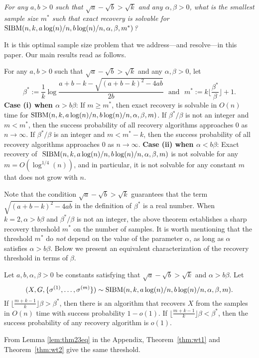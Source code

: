 \documentclass{article}
\begin{document}
\vspace*{.1in}
 \emph{For any $a,b> 0$ such that $\sqrt{a}-\sqrt{b}> \sqrt{k}$ and any $\alpha,\beta>0$, what is the smallest sample size $m^\ast$ such that exact recovery is solvable for $\operatorname{SIBM}(n,k, a\log(n)/n, b\log(n)/n,\alpha,\beta,m^\ast)$?}

\vspace*{.1in}  It is this optimal sample size problem that we address---and resolve---in this paper. 
Our main results read as follows.

\begin{theorem} \label{thm:wt1}
For any $a,b> 0$ such that $\sqrt{a}-\sqrt{b}> \sqrt{k}$ and any $\alpha,\beta>0$, let
\begin{equation} \label{eq:defstar}
\beta^\ast := \frac{1}{k}
\log\frac{a+b-k-\sqrt{(a+b-k)^2-4ab}}{2 b} \text{~~and~~}
m^\ast := k \Big\lfloor \frac{\beta^\ast}{\beta} \Big\rfloor +1  .
\end{equation}
{\bf Case (i) when $\alpha>b\beta$}: If $m\ge m^\ast$, then exact recovery is solvable in $O(n)$ time for $\SIBM(n,k, a\log(n)/n, \linebreak[4] b\log(n)/n,\alpha,\beta,m)$.
If $\beta^\ast/\beta$ is not an integer and $m < m^*$, then the success probability of all recovery algorithms approaches $0$ as $n\to\infty$. If $\beta^\ast/\beta$ is an integer and $m < m^* - k$, then the success probability of all recovery algorithms approaches $0$ as $n\to\infty$.
{\bf Case (ii) when $\alpha<b\beta$}: Exact recovery of $~\operatorname{SIBM}(n,k, a\log(n)/n, b\log(n)/n,\alpha,\beta,m)$ is not solvable for any $m=O(\log^{1/4}(n))$, and in particular, it is not solvable for any constant $m$ that does not grow with $n$.
\end{theorem}
Note that the condition $\sqrt{a}-\sqrt{b} > \sqrt{k}$ guarantees that the term $\sqrt{(a+b-k)^2-4ab}$ in the definition of $\beta^\ast$ is a  real number.
When $k=2, \alpha>b\beta$ and $\beta^\ast/\beta$ is not an integer,
the above theorem establishes a sharp recovery threshold $m^\ast$ on the number of samples. It is worth mentioning that the threshold $m^\ast$ do {\em not} depend on the value of the parameter $\alpha$, as long as $\alpha$ satisfies $\alpha>b\beta$.
Below we present an equivalent characterization of the recovery threshold in terms of $\beta$.
\begin{theorem} \label{thm:wt2}
	Let $a,b,\alpha,\beta> 0$ be constants satisfying that $\sqrt{a}-\sqrt{b} > \sqrt{k}$ and $\alpha>b\beta$. 
	Let 
	$$
	(X,G,\{\sigma^{(1)},\dots,\sigma^{(m)}\}) \sim \operatorname{SIBM}(n, k, a\log(n)/n, b\log(n)/n,\alpha,\beta,m).
	$$
	If $\lfloor \frac{m+k-1}{k} \rfloor \beta>\beta^\ast$, then there is an algorithm that recovers $X$ from the samples in $O(n)$ time with success probability $1-o(1)$. If $\lfloor \frac{m+k-1}{k} \rfloor \beta <\beta^\ast$, then the success probability of any recovery algorithm is $o(1)$. 
\end{theorem}
From Lemma \ref{lem:thm23eq} in the Appendix, Theorem~\ref{thm:wt1} and Theorem~\ref{thm:wt2} give the same threshold.
\end{document}
